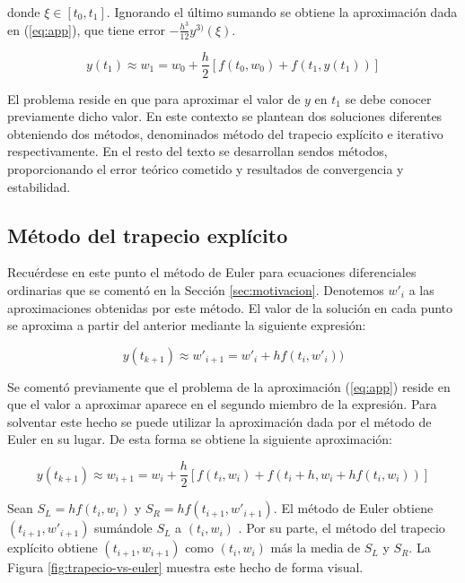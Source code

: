 \documentclass{article}
\theoremstyle{theorem-style}  %
\theoremstyle{definition}
\theoremstyle{example-style}
\begin{document}
	donde $\xi \in [t_0, t_1]$. Ignorando el último sumando se obtiene la aproximación dada en (\ref{eq:app}), que tiene error $- \frac{h^3}{12}y^{3)}(\xi)$.

	\begin{equation} \label{eq:app}
		y(t_1) \approx w_1 = w_0 + \frac{h}{2} \left[f(t_0,w_0) + f(t_1, y(t_1))\right]
	\end{equation}

	El problema reside en que para aproximar el valor de $y$ en $t_1$ se debe conocer previamente dicho valor. En este contexto se plantean dos soluciones diferentes obteniendo dos métodos, denominados método del trapecio explícito e iterativo respectivamente. En el resto del texto se desarrollan sendos métodos, proporcionando el error teórico cometido y resultados de convergencia y estabilidad.
	
	\subsection{Método del trapecio explícito}
		
		Recuérdese en este punto el método de Euler para ecuaciones diferenciales ordinarias que se comentó en la Sección \ref{sec:motivacion}. Denotemos $w'_i$ a las aproximaciones obtenidas por este método. El valor de la solución en cada punto se aproxima a partir del anterior mediante la siguiente expresión:
		
		\begin{equation*} \label{eq:euler}
			y(t_{k+1}) \approx w'_{i+1} = w'_i + h f(t_i,w'_i))
		\end{equation*}

		Se comentó previamente que el problema de la aproximación (\ref{eq:app}) reside en que el valor a aproximar aparece en el segundo miembro de la expresión. Para solventar este hecho se puede utilizar la aproximación dada por el método de Euler en su lugar. De esta forma se obtiene la siguiente aproximación:

		\begin{equation} \label{eq:app-exp}
			y(t_{k+1}) \approx w_{i+1} = w_i + \frac{h}{2} \left[f(t_i,w_i) + f(t_{i}+h, w_i + h f(t_i,w_i))\right]
		\end{equation}

		Sean $S_L = h f(t_i,w_i) $ y $S_R = h f(t_{i+1}, w'_{i+1})$. El método de Euler  obtiene $(t_{i+1}, w'_{i+1})$ sumándole $S_L$ a $(t_{i}, w_{i})$ . Por su parte, el método del trapecio explícito obtiene $(t_{i+1}, w_{i+1})$ como $(t_{i}, w_{i})$ más la media de $S_L$ y $S_R$. La Figura \ref{fig:trapecio-vs-euler} muestra este hecho de forma visual.
			
\end{document}
